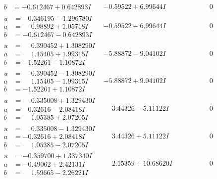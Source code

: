 \documentclass[1p]{elsarticle_modified}
\theoremstyle{definition}
\begin{document}
$$\begin{array}{c|c|c}
\begin{aligned}
b &= -0.612467 + 0.642893 I\end{aligned}
 & -0.59522 + 6.99644 I & \phantom{-0.000000 } 0 \\ \hline\begin{aligned}
u &= -0.346195 - 1.296780 I \\
a &= \phantom{-}0.98892 + 1.05718 I \\
b &= -0.612467 - 0.642893 I\end{aligned}
 & -0.59522 - 6.99644 I & \phantom{-0.000000 } 0 \\ \hline\begin{aligned}
u &= \phantom{-}0.390452 + 1.308290 I \\
a &= \phantom{-}1.15405 + 1.99315 I \\
b &= -1.52261 - 1.10872 I\end{aligned}
 & -5.88872 - 9.04102 I & \phantom{-0.000000 } 0 \\ \hline\begin{aligned}
u &= \phantom{-}0.390452 - 1.308290 I \\
a &= \phantom{-}1.15405 - 1.99315 I \\
b &= -1.52261 + 1.10872 I\end{aligned}
 & -5.88872 + 9.04102 I & \phantom{-0.000000 } 0 \\ \hline\begin{aligned}
u &= \phantom{-}0.335008 + 1.329430 I \\
a &= -0.32616 - 2.08418 I \\
b &= \phantom{-}1.05385 + 2.07205 I\end{aligned}
 & \phantom{-}3.44326 - 5.11122 I & \phantom{-0.000000 } 0 \\ \hline\begin{aligned}
u &= \phantom{-}0.335008 - 1.329430 I \\
a &= -0.32616 + 2.08418 I \\
b &= \phantom{-}1.05385 - 2.07205 I\end{aligned}
 & \phantom{-}3.44326 + 5.11122 I & \phantom{-0.000000 } 0 \\ \hline\begin{aligned}
u &= -0.359700 + 1.337340 I \\
a &= -0.49062 + 2.42131 I \\
b &= \phantom{-}1.59665 - 2.26221 I\end{aligned}
 & \phantom{-}2.15359 + 10.68620 I & \phantom{-0.000000 } 0 \\ \hline\begin{aligned}

\end{aligned}
\end{array}$$
\end{document}

